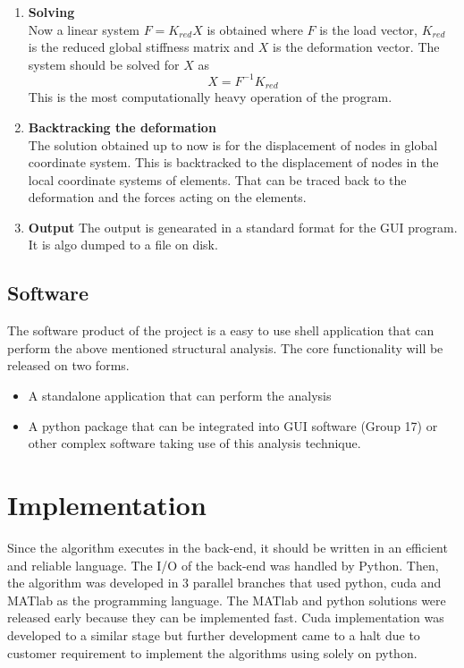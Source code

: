 \documentclass[12pt]{article}
\begin{document}
\begin{enumerate}
    \item \textbf{Solving}\\
    Now a linear system $F = K_{red}X$ is obtained where $F$ is the load vector, $K_{red}$ is the reduced global stiffness matrix and $X$ is the deformation vector. The system should be solved for $X$ as $$X = F^{-1}K_{red}$$ This is the most computationally heavy operation of the program.
    
    \item \textbf{Backtracking the deformation} \\
    The solution obtained up to now is for the displacement of nodes in global coordinate system. This is backtracked to the displacement of nodes in the local coordinate systems of elements. That can be traced back to the deformation and the forces acting on the elements.
    
    \item \textbf{Output}
    The output is genearated in a standard format for the GUI program. It is algo dumped to a file on disk.\\
\end{enumerate}

\subsection{Software}
The software product of the project is a easy to use shell application that can perform the above mentioned structural analysis. The core functionality will be released on two forms.
\begin{itemize}
    \item A standalone application that can perform the analysis
    \item A python package that can be integrated into GUI software (Group 17) or other complex software taking use of this analysis technique.
\end{itemize}
\section{Implementation}
Since the algorithm executes in the back-end, it should be written in an efficient and reliable language. The I/O of the back-end was handled by Python. Then, the algorithm was developed in 3 parallel branches that used python, cuda and MATlab as the programming language. The MATlab and python solutions were released early because they can be implemented fast. Cuda implementation was developed to a similar stage but further development came to a halt due to customer requirement to implement the algorithms using solely on python.
\end{document}
